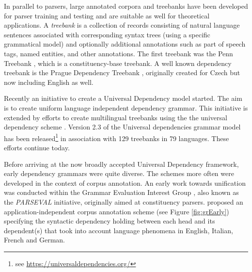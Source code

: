     In parallel to parsers, large annotated corpora and treebanks have been developed for parser training and testing and are suitable as well for theoretical applications. A \textit{treebank} is a collection of records consisting of natural language sentences associated with corresponding syntax trees (using a specific grammatical model) and optionally additional annotations such as part of speech tags, named entities, and other annotations. The first treebank was the Penn Treebank \citep{Santorini1990,Marcus1993}, which is a constituency-base treebank. A well known dependency treebank is the Prague Dependency Treebank \citep{hajic2001prague,Bohmova2003}, originally created for Czech but now including English as well. 
    
    Recently an initiative to create a Universal Dependency model \citep{nivre2015} started. The aim is to create uniform language independent dependency grammar. This initiative is extended by efforts to create multilingual treebanks using the the universal dependency scheme \citep{Nivre2016ud}. Version 2.3 of the Universal dependencies grammar model has been released\footnote{see \url{https://universaldependencies.org/}} in association with 129 treebanks in 79 languages. These efforts continue today. 

    Before arriving at the now broadly accepted Universal Dependency framework, early dependency grammars were quite diverse. The schemes more often were developed in the context of corpus annotation. An early work \citep{carroll1998parser} towards unification was conducted within the Grammar Evaluation Interest Group \citep{Harrison1991}, also known as the \textit{PARSEVAL} initiative, originally aimed at constituency parsers. \citet{Carroll1999} proposed an application-independent corpus annotation scheme (see Figure \ref{fig:grEarly}) specifying the syntactic dependency holding between each head and its dependent(s) that took into account language phenomena in English, Italian, French and German. 


